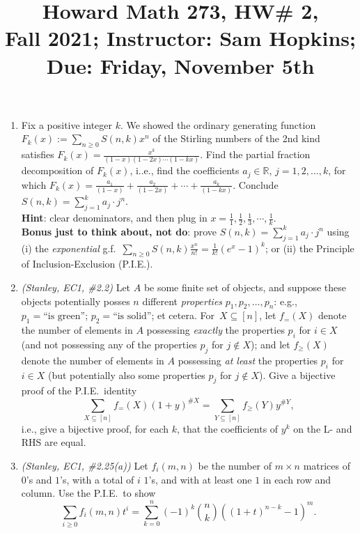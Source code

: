 \documentclass[11pt]{article}
\title{Howard Math 273, HW\# 2, \\ {\normalsize Fall 2021; Instructor: Sam Hopkins; Due: Friday, November 5th}}
\date{}
\begin{document}
\maketitle

\thispagestyle{empty}

\vspace{-1.8cm}

\begin{enumerate}

\item Fix a positive integer $k$. We showed the ordinary generating function $F_k(x) := \sum_{n\geq 0}S(n,k)x^n$ of the Stirling numbers of the 2nd kind satisfies $F_k(x) = \frac{x^k}{(1-x)(1-2x)\cdots(1-kx)}$. Find the partial fraction decomposition of $F_k(x)$, i..e., find the coefficients $a_j \in \mathbb{R}$, $j=1,2,\ldots,k$, for which $F_k(x) = \frac{a_1}{(1-x)} + \frac{a_2}{(1-2x)} + \cdots + \frac{a_k}{(1-kx)}$. Conclude $S(n,k) = \sum_{j=1}^{k} a_j \cdot j^n$. \\
{\bf Hint}: clear denominators, and then plug in $x=\frac{1}{1}, \frac{1}{2}, \frac{1}{3}, \cdots, \frac{1}{k}$. \\
{\bf Bonus just to think about, not do}: prove $S(n,k) = \sum_{j=1}^{k} a_j \cdot j^n$ using (i) the \emph{exponential} g.f.~$\sum_{n \geq 0} S(n,k) \frac{x^n}{n!} = \frac{1}{k!}(e^x-1)^k$; or (ii) the Principle of Inclusion-Exclusion (P.I.E.).

\item \emph{(Stanley, EC1, \#2.2)} Let $A$ be some finite set of objects, and suppose these objects potentially posses $n$ different \emph{properties} $p_1,p_2,\ldots,p_n$: e.g., $p_1=\textrm{``is green''}$; $p_2=\textrm{``is solid''}$; et cetera.  For~$X\subseteq [n]$, let $f_{=}(X)$ denote the number of elements in $A$ possessing \emph{exactly} the properties $p_i$ for $i\in X$ (and not possessing any of the properties $p_j$ for $j\notin X$); and let $f_{\geq}(X)$ denote the number of elements in $A$ possessing \emph{at least} the properties $p_i$ for $i\in X$ (but potentially also some properties $p_j$ for $j\notin X$). Give a bijective proof of the P.I.E.~identity
\[ \sum_{X\subseteq [n]} f_{=}(X) (1+y)^{\# X} = \sum_{Y\subseteq [n]} f_{\geq}(Y) y^{\#Y},\]
i.e., give a bijective proof, for each $k$, that the coefficients of $y^k$ on the L- and RHS are equal.

\item \emph{(Stanley, EC1, \#2.25(a))} Let $f_i(m,n)$ be the number of $m\times n$ matrices of $0$'s and $1$'s, with a total of $i$ $1$'s, and with at least one $1$ in each row and column. Use the P.I.E.~to show
\[ \sum_{i \geq 0} f_i(m,n) t^i = \sum_{k=0}^{n}(-1)^k\binom{n}{k}( (1+t)^{n-k}-1)^m.\]


\end{enumerate}
\end{document}
